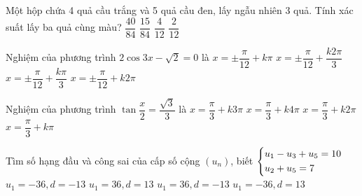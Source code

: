 \begin{ex} %
	Một hộp chứa 4 quả cầu trắng và 5 quả cầu đen, lấy ngẫu nhiên 3 quả. Tính xác suất lấy ba quả cùng màu?
	\choice
	{$\dfrac{40}{84}$}
	{$\dfrac{15}{84}$}
	{$\dfrac{4}{12}$}
	{\True $\dfrac{2}{12}$}
\end{ex}
\begin{ex} %
	Nghiệm của phương trình $2\cos 3x-\sqrt{2}=0$ là
	\choice
	{$x=\pm \dfrac{\pi}{12}+k\pi $}
	{\True $x=\pm \dfrac{\pi}{12}+\dfrac{k2\pi}{3}$}
	{$x=\pm \dfrac{\pi}{12}+\dfrac{k\pi}{3}$}
	{$x=\pm \dfrac{\pi}{12}+k2\pi$}
\end{ex}
\begin{ex} %
	Nghiệm của phương trình $\tan \dfrac{x}{2}=\dfrac{\sqrt{3}}{3}$ là
	\choice
	{$x=\dfrac{\pi}{3}+k3\pi$}
	{$x=\dfrac{\pi}{3}+k4\pi$}
	{\True $x=\dfrac{\pi}{3}+k2\pi$}
	{$x=\dfrac{\pi}{3}+k\pi$}
\end{ex}
\begin{ex} %
	Tìm số hạng đầu và công sai của cấp số cộng $\left({u_n}\right)$, biết $\left\{\begin{aligned}& u_1-u_3+u_5=10\\& u_2+u_5=7\end{aligned}\right.$
	\choice
	{$u_1=-36,d=-13$}
	{$u_1=36,d=13$}
	{\True $u_1=36,d=-13$}
	{$u_1=-36,d=13$}
\end{ex}

